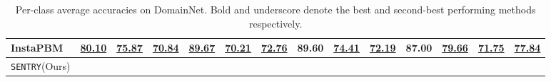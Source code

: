 \documentclass[10pt,twocolumn,letterpaper]{article}
\newcommand{\method}{\texttt{SENTRY}\xspace}
\begin{document}
\begin{table*}[t]
\begin{center}
{\begin{tabular}{l c c c c c c c c c c c c c}
        InstaPBM~\cite{li2020rethinking} & \underline{80.10} & \underline{75.87} & \underline{70.84} & \underline{89.67} & \underline{70.21} & \underline{72.76} & 89.60 & \underline{74.41} & \underline{72.19} & 87.00 & \underline{79.66} & \underline{71.75} & \underline{77.84} \\
        \midrule
        \method (Ours) &  &  &  &  &  &  &  &  &  &  &  &  &  \\        
        \bottomrule
        \end{tabular}}
        \vspace{-5pt}
        \caption{Per-class average accuracies on DomainNet. Bold and underscore denote the best and second-best performing methods respectively.}\label{tab:domainnet}
        \vspace{-10pt}
    \end{center}
    \end{table*}
\end{document}
